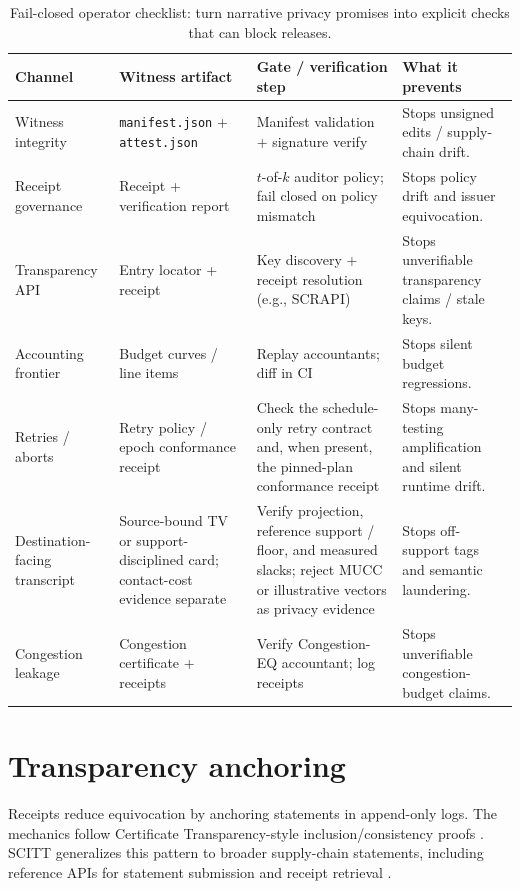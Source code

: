 \documentclass[11pt]{article}
\begin{document}
\begin{table}[t]
\centering
\small
\begin{tabular}{@{}L{2.0cm}L{3.6cm}L{5.0cm}L{3.1cm}@{}}
\toprule
Channel & Witness artifact & Gate / verification step & What it prevents \\
\midrule
Witness integrity & \texttt{manifest.json} + \texttt{attest.json} & Manifest validation + signature verify & Stops unsigned edits / supply-chain drift. \\
Receipt governance & Receipt + verification report & $t$-of-$k$ auditor policy; fail closed on policy mismatch & Stops policy drift and issuer equivocation. \\
Transparency API & Entry locator + receipt & Key discovery + receipt resolution (e.g., SCRAPI) \cite{scitt_scrapi} & Stops unverifiable transparency claims / stale keys. \\
Accounting frontier & Budget curves / line items & Replay accountants; diff in CI & Stops silent budget regressions. \\
Retries / aborts & Retry policy / epoch conformance receipt & Check the schedule-only retry contract and, when present, the pinned-plan conformance receipt \cite{series:schedretries,series:proofcarryingbudgets} & Stops many-testing amplification and silent runtime drift. \\
Destination-facing transcript & Source-bound TV or support-disciplined card; contact-cost evidence separate & Verify projection, reference support / floor, and measured slacks; reject MUCC or illustrative vectors as privacy evidence & Stops off-support tags and semantic laundering. \\
Congestion leakage & Congestion certificate + receipts & Verify Congestion-EQ accountant; log receipts \cite{series:wcongeq} & Stops unverifiable congestion-budget claims. \\
\bottomrule
\end{tabular}
\caption{Fail-closed operator checklist: turn narrative privacy promises into explicit checks that can block releases.}
\label{tab:operator-checklist}
\end{table}

\section{Transparency anchoring}
\label{sec:transparency}
Receipts reduce equivocation by anchoring statements in append-only logs.
The mechanics follow Certificate Transparency-style inclusion/consistency proofs \cite{rfc9162}.
SCITT generalizes this pattern to broader supply-chain statements, including reference APIs for statement submission and receipt retrieval \cite{scitt_arch,scitt_scrapi}.
\end{document}
